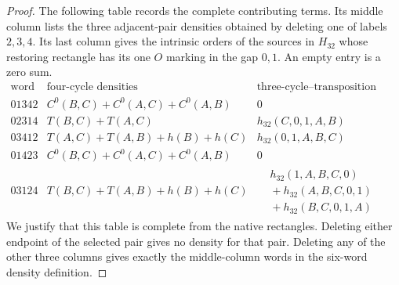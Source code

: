 \documentclass[11pt,oneside]{report}
\theoremstyle{definition}
\numberwithin{equation}{section}
\begin{document}
\begin{proof}
The following table records the complete contributing terms. Its
middle column lists the three adjacent-pair densities obtained by
deleting one of labels $2,3,4$. Its last column gives the intrinsic
orders of the sources in $H_{32}$ whose restoring rectangle has its
one $O$ marking in the gap $0,1$. An empty entry is a zero sum.
\[
\begin{array}{c|c|l}
 \text{word}&\text{four-cycle densities}&
             \text{three-cycle--transposition coefficients}\\\hline
 01342&C^0(B,C)+C^0(A,C)+C^0(A,B)&0\\
 02314&T(B,C)+T(A,C)&h_{32}(C,0,1,A,B)\\
 03412&T(A,C)+T(A,B)+h(B)+h(C)&h_{32}(0,1,A,B,C)\\
 01423&C^0(B,C)+C^0(A,C)+C^0(A,B)&0\\
 03124&T(B,C)+T(A,B)+h(B)+h(C)&
       \begin{aligned}
       &h_{32}(1,A,B,C,0)\\
       &{}+h_{32}(A,B,C,0,1)\\
       &{}+h_{32}(B,C,0,1,A)
       \end{aligned}
\end{array}
\tag{M4B.1}
\]
We justify that this table is complete from the native rectangles.
Deleting either endpoint of the selected pair gives no density for
that pair. Deleting any of the other three columns gives exactly the
middle-column words in the six-word density definition.


\end{proof}
\end{document}
